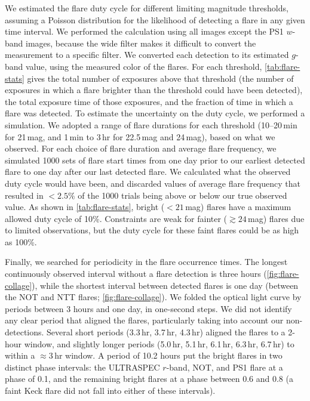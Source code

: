 \documentclass{nature_plusfigure}
\begin{document}
\begin{methods}
We estimated the flare duty cycle for different limiting magnitude thresholds, assuming a Poisson distribution for the likelihood of detecting a flare in any given time interval. We performed the calculation using all images except the PS1 $w$-band images, because the wide filter makes it difficult to convert the measurement to a specific filter.
We converted each detection to its estimated $g$-band value, using the measured color of the flares.
For each threshold, \ref{tab:flare-stats} gives the total number of exposures above that threshold (the number of exposures in which a flare brighter than the threshold could have been detected), the total exposure time of those exposures, and the fraction of time in which a flare was detected. To estimate the uncertainty on the duty cycle, we performed a simulation. We adopted a range of flare durations for each threshold (10--20\,min for 21\,mag, and 1\,min to 3\,hr for 22.5\,mag and 24\,mag), based on what we observed. For each choice of flare duration and average flare frequency, we simulated 1000 sets of flare start times from one day prior to our earliest detected flare to one day after our last detected flare. We calculated what the observed duty cycle would have been, and discarded values of average flare frequency that resulted in $<2.5\%$ of the 1000 trials being above or below our true observed value.  As shown in \ref{tab:flare-stats}, bright ($<21$\,mag) flares have a maximum allowed duty cycle of 10\%. Constraints are weak for fainter ($\gtrsim24$\,mag) flares due to limited observations, but the duty cycle for these faint flares could be as high as 100\%.  

Finally, we searched for periodicity in the flare occurrence times. The longest continuously observed interval without a flare detection is three hours (\ref{fig:flare-collage}), while the shortest interval between detected flares is one day (between the NOT and NTT flares; \ref{fig:flare-collage}). We folded the optical light curve by periods between 3 hours and one day, in one-second steps.
We did not identify any clear period that aligned the flares, particularly taking into account our non-detections.
Several short periods (3.3\,hr, 3.7\,hr, 4.3\,hr) aligned the flares to a 2-hour window, and slightly longer periods (5.0\,hr, 5.1\,hr, 6.1\,hr, 6.3\,hr, 6.7\,hr) to within a $\approx3$\,hr window.
A period of 10.2 hours put the bright flares in two distinct phase intervals: the ULTRASPEC $r$-band, NOT, and PS1 flare at a phase of 0.1, and the remaining bright flares at a phase between 0.6 and 0.8 (a faint Keck flare did not fall into either of these intervals).  


\end{methods}
\end{document}
